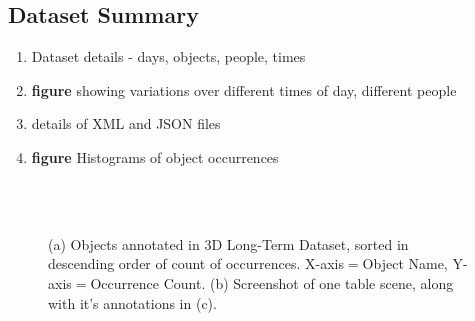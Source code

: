 \documentclass[letterpaper, 10 pt, conference]{ieeeconf}  %
\begin{document}
\subsection{Dataset Summary}
\begin{enumerate}
	\item Dataset details - days, objects, people, times
	\item \textbf{figure} showing variations over different times of day, different people
	\item details of XML and JSON files
	\item \textbf{figure} Histograms of object occurrences
\end{enumerate}

\begin{figure}[t]
\begin{center}
\\
\\
\caption{(a) Objects annotated in 3D Long-Term Dataset, sorted in descending order of count of occurrences. X-axis$=$Object Name, Y-axis$=$Occurrence Count. (b) Screenshot of one table scene, along with it's annotations in (c).}

\end{center}
\end{figure}
\end{document}
